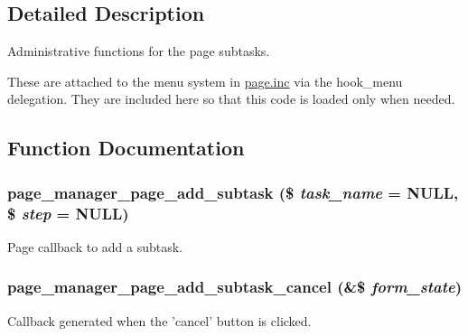 \subsection{Detailed Description}
Administrative functions for the page subtasks.

These are attached to the menu system in \hyperlink{page_8inc}{page.inc} via the hook\_\-menu delegation. They are included here so that this code is loaded only when needed. 

\subsection{Function Documentation}
\hypertarget{page_8admin_8inc_a7c43b68471e1c72718478ca93e1bc25d}{
\subsubsection[{page\_\-manager\_\-page\_\-add\_\-subtask}]{\setlength{\rightskip}{0pt plus 5cm}page\_\-manager\_\-page\_\-add\_\-subtask (\$ {\em task\_\-name} = {\ttfamily NULL}, \/  \$ {\em step} = {\ttfamily NULL})}}
\label{page_8admin_8inc_a7c43b68471e1c72718478ca93e1bc25d}
Page callback to add a subtask. \hypertarget{page_8admin_8inc_afc73a5c25508280f01b32bddca4d15a7}{
\subsubsection[{page\_\-manager\_\-page\_\-add\_\-subtask\_\-cancel}]{\setlength{\rightskip}{0pt plus 5cm}page\_\-manager\_\-page\_\-add\_\-subtask\_\-cancel (\&\$ {\em form\_\-state})}}
\label{page_8admin_8inc_afc73a5c25508280f01b32bddca4d15a7}
Callback generated when the 'cancel' button is clicked.

